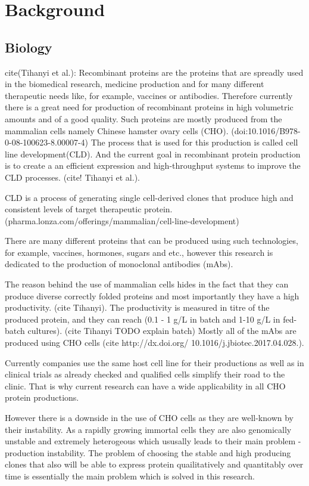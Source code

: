 \section{Background}
\subsection{Biology}
cite(Tihanyi et al.):
Recombinant proteins are the proteins that are spreadly used in the biomedical research, medicine production and for many different therapeutic needs like, for example, vaccines or antibodies. Therefore currently there is a great need for production of recombinant proteins in high volumetric amounts and of a good quality. Such proteins are mostly produced from the mammalian cells namely Chinese hamster ovary cells (CHO). (doi:10.1016/B978-0-08-100623-8.00007-4) The process that is used for this production is called cell line development(CLD). And the current goal in recombinant protein production is to create a an efficient expression and high-throughput systems to improve the CLD processes. (cite! Tihanyi et al.). 

CLD is a process of generating single cell-derived clones that produce high and consistent levels of target therapeutic protein. (pharma.lonza.com/offerings/mammalian/cell-line-development)


There are many different proteins that can be produced using such technologies, for example, vaccines, hormones, sugars and etc., however this research is dedicated to the production of monoclonal antibodies (mAbs). 

The reason behind the use of mammalian cells hides in the fact that they can produce diverse correctly folded proteins and most importantly they have a high productivity. (cite Tihanyi). The productivity is measured in titre of the produced protein, and they can reach (0.1 - 1 g/L in batch and 1-10 g/L in fed-batch cultures). (cite Tihanyi TODO explain batch) Mostly all of the mAbs are produced using CHO cells (cite http://dx.doi.org/ 10.1016/j.jbiotec.2017.04.028.).

Currently companies use the same host cell line for their productions as well as in clinical trials as already checked and qualified cells simplify their road to the clinic. That is why current research can have a wide applicability in all CHO protein productions.

However there is a downside in the use of CHO cells as they are well-known by their instability. As a rapidly growing immortal cells they are also genomically unstable and extremely heterogeous which ususally leads to their main problem - production instability. The problem of choosing the stable and high producing clones that also will be able to express protein quailitatively and quantitably over time is essentially the main problem which is solved in this research.

